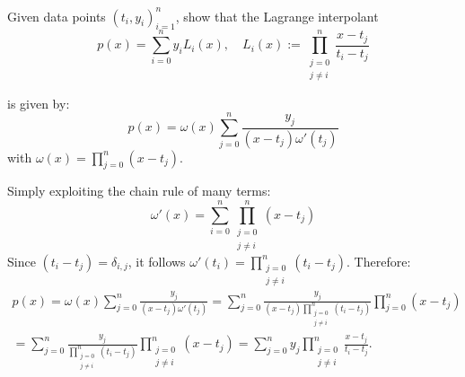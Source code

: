 \begin{problem}
 
 Given data points $(t_i, y_i)_{i = 1}^n$, show that the Lagrange interpolant
 \[
  p(x) = \sum_{i = 0}^n y_i L_i(x), \quad L_i(x) := \prod_{\substack{j = 0\\ j \neq i}}^n \frac{x - t_j}{t_i - t_j}
 \]

 is given by:
 \[
  p(x) =  \omega(x)  \sum_{j = 0}^n \frac{y_j}{(x-t_j) \omega' (t_j)}
 \]
 with $\omega(x) = \prod_{j = 0}^n (x - t_j)$.
 
 \begin{solution}
 Simply exploiting the chain rule of many terms:
  \[
   \omega'(x) = \sum_{i = 0}^n \prod_{\substack{j = 0\\ j \neq i}}^n (x - t_j)
  \]
  Since $(t_i - t_j) = \delta_{i,j}$, it follows $\omega'(t_i) = \prod_{\substack{j = 0\\ j \neq i}}^n (t_i - t_j)$.
  Therefore:
  \begin{align*}
  p(x) =  \omega(x)  \sum_{j = 0}^n \frac{y_j}{(x-t_j) \omega' (t_j)} = \sum_{j = 0}^n \frac{y_j}{(x-t_j) \prod_{\substack{j = 0\\ j \neq i}}^n (t_i - t_j)} \prod_{j = 0}^n (x - t_j) \\
= \sum_{j = 0}^n \frac{y_j}{\prod_{\substack{j = 0\\ j \neq i}}^n (t_i - t_j)} \prod_{\substack{j = 0\\ j \neq i}}^n (x - t_j) = \sum_{j = 0}^n y_j \prod_{\substack{j = 0\\ j \neq i}}^n \frac{x - t_j}{t_i - t_j}.
  \end{align*}


 \end{solution}

 
\end{problem}
